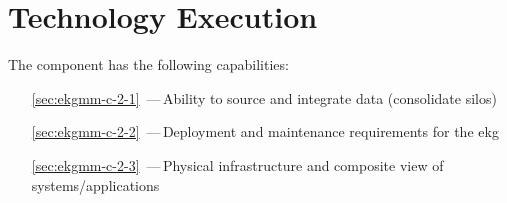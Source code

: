 \chapter{Technology Execution}\label{ch:ekg-mm-c-2}

The  component has the following capabilities:

\begin{itemize}[leftmargin=.5in]
  \item [\ref{sec:ekgmm-c-2-1}] \,---\,Ability to source and integrate data (consolidate silos)
  \item [\ref{sec:ekgmm-c-2-2}] \,---\,Deployment and maintenance requirements for the \gls{ekg}
  \item [\ref{sec:ekgmm-c-2-3}] \,---\,Physical infrastructure and composite view of systems/applications
\end{itemize}




